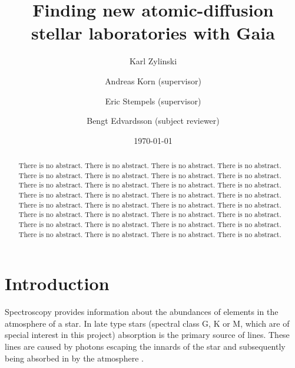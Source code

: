 \documentclass[twocolumn]{aastex62}
\begin{document}
\title{Finding new atomic-diffusion stellar laboratories with Gaia}
\author{Karl Zylinski}

\author{Andreas Korn (supervisor)}

\author{Eric Stempels (supervisor)}

\author{Bengt Edvardsson (subject reviewer)}


\date{\today}

\begin{abstract}
There is no abstract. There is no abstract. There is no abstract. There is no abstract. There is no abstract. There is no abstract. There is no abstract. There is no abstract. There is no abstract. There is no abstract. There is no abstract. There is no abstract. There is no abstract. There is no abstract. There is no abstract. There is no abstract. There is no abstract. There is no abstract. There is no abstract. There is no abstract. There is no abstract. There is no abstract. There is no abstract. There is no abstract. There is no abstract. There is no abstract. There is no abstract. There is no abstract. There is no abstract. There is no abstract. There is no abstract. There is no abstract. \\
\end{abstract}

\section{Introduction}
Spectroscopy provides information about the abundances of elements in the atmosphere of a star. In late type stars (spectral class G, K or M, which are of special interest in this project) absorption is the primary source of lines. These lines are caused by photons escaping the innards of the star and subsequently being absorbed in by the atmosphere \citep{Kartunnen_p227}.
\end{document}
